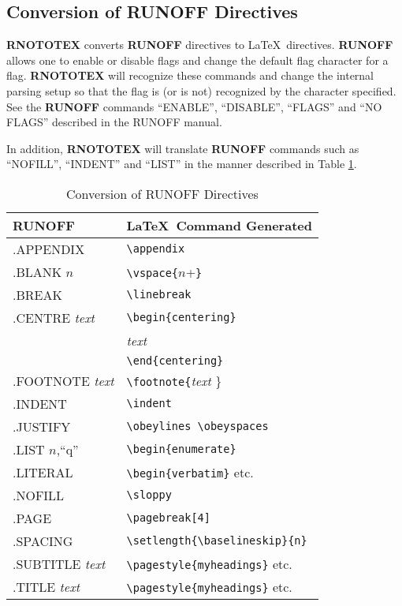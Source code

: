 \subsection{Conversion of RUNOFF Directives}

{\bf RNOTOTEX} converts {\bf RUNOFF} directives to \LaTeX\ directives. {\bf
RUNOFF} allows one to enable or disable flags and change the default flag
character for a flag.  {\bf RNOTOTEX} will recognize these commands and change
the internal parsing setup so that the flag is (or is not) recognized by the
character specified.  See the {\bf RUNOFF} commands ``ENABLE'', ``DISABLE'',
``FLAGS'' and ``NO FLAGS'' described in the RUNOFF manual.

In addition, {\bf RNOTOTEX} will translate {\bf RUNOFF} commands such as
``NOFILL'', ``INDENT'' and ``LIST'' in the manner described in Table
\ref{directive-commands}.

\begin{table}[h]
\begin{center}
\begin{tabular}{ll}
{\large\bf RUNOFF } 	    & {\LaTeX\ \large\bf Command Generated} \\ \hline
.APPENDIX		    & \verb+\appendix+ \\
.BLANK $n$		    & \verb+\vspace{+$n$+\verb+}+ \\
.BREAK			    & \verb+\linebreak+ \\
.CENTRE {\it text }         & \verb+\begin{centering}+ \\
			    &   {\it text } \\
			    & \verb+\end{centering}+ \\
.FOOTNOTE {\it text}	    & \verb+\footnote{+{\it text }\} \\
.INDENT			    & \verb+\indent+ \\
.JUSTIFY		    & \verb+\obeylines \obeyspaces+ \\
.LIST $n$,``q''		    & \verb+\begin{enumerate}+ \\
.LITERAL		    & \verb+\begin{verbatim}+ etc. \\
.NOFILL			    & \verb+\sloppy+ \\
.PAGE			    & \verb+\pagebreak[4]+ \\
.SPACING		    & \verb+\setlength{\baselineskip}{n}+ \\
.SUBTITLE  {\it text}	    & \verb+\pagestyle{myheadings}+ etc. \\
.TITLE {\it text}	    & \verb+\pagestyle{myheadings}+ etc. \\ \hline
\end{tabular}
\caption{Conversion of RUNOFF Directives\label{directive-commands}}
\end{center}
\end{table}

